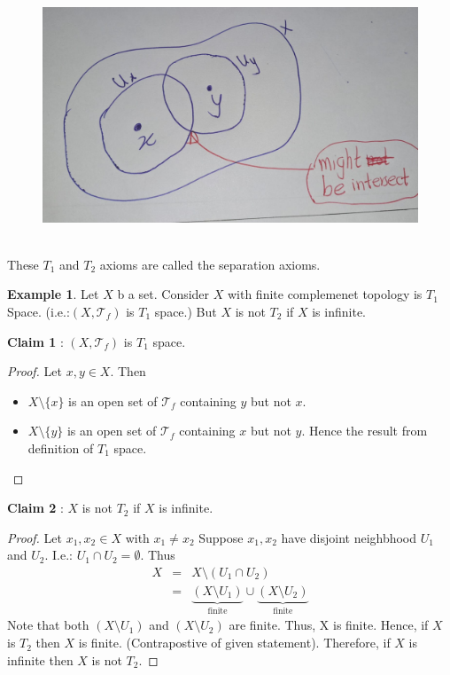 \documentclass[
]{book}
\providecommand{\tightlist}{%
  \setlength{\itemsep}{0pt}\setlength{\parskip}{0pt}}
\theoremstyle{definition}
\theoremstyle{definition}
\newtheorem{example}{Example}[chapter]
\theoremstyle{definition}
\theoremstyle{definition}
\theoremstyle{remark}
\begin{document}
\begin{figure}
\centering
\includegraphics{figures/figure 17.jpg}
\caption{\label{fig:fig17}\(~\)}
\end{figure}

These \(T_1\) and \(T_2\) axioms are called the separation axioms.

\begin{example}
\protect\hypertarget{exm:unnamed-chunk-77}{}\label{exm:unnamed-chunk-77}Let \(X\) b a set. Consider \(X\) with finite complemenet topology is \(T_1\) Space. (i.e.:\((X,\mathcal{T}_f)\) is \(T_1\) space.) But \(X\) is not \(T_2\) if \(X\) is infinite.
\end{example}

\textbf{Claim 1} : \((X,\mathcal{T}_{f})\) is \(T_1\) space.

\begin{proof}

Let \(x,y\in X\). Then

\begin{itemize}
\tightlist
\item
  \(X\setminus \{x\}\) is an open set of \(\mathcal{T}_{f}\) containing \(y\) but not \(x\).
\item
  \(X\setminus \{y\}\) is an open set of \(\mathcal{T}_{f}\) containing \(x\)
  but not \(y\).
  Hence the result from definition of \(T_1\) space.
\end{itemize}

\end{proof}

\textbf{Claim 2} : \(X\) is not \(T_2\) if \(X\) is infinite.

\begin{proof}
Let \(x_1,x_2\in X\) with \(x_1\neq x_2\) Suppose \(x_1,x_2\) have disjoint neighbhood \(U_1\) and \(U_2\). I.e.: \(U_1\cap U_2=\emptyset\). Thus
\begin{eqnarray}
X &=& X\setminus (U_1\cap U_2)\\
&=& \underbrace{(X \setminus U_1 )}_{\text{finite}} \cup \underbrace{(X\setminus U_2)}_{\text{finite}}
\end{eqnarray}
Note that both \((X \setminus U_1 )\) and \((X \setminus U_2 )\) are finite. Thus, X is finite. Hence, if \(X\) is \(T_2\) then \(X\) is finite. (Contrapostive of given statement). Therefore, if \(X\) is infinite then \(X\) is not \(T_2\).
\end{proof}
\end{document}
